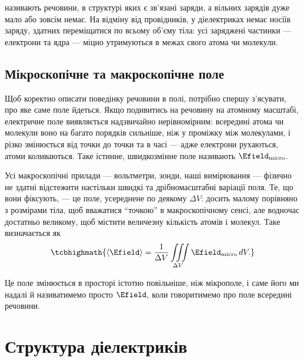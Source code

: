 \begin{Attention}
	 називають речовини, в структурі яких є зв'язані заряди, а вільних зарядів дуже мало або зовсім немає. На відміну від
	провідників, у діелектриках немає носіїв заряду, здатних переміщатися по всьому об'єму тіла: усі заряджені частинки --- електрони та ядра ---
	міцно утримуються в межах свого атома чи молекули.
\end{Attention}

\subsection*{Мікроскопічне та макроскопічне поле}

Щоб коректно описати поведінку речовини в полі, потрібно спершу з'ясувати, про яке саме поле йдеться. Якщо подивитись на речовину на атомному
масштабі, електричне поле виявляється надзвичайно нерівномірним: всередині атома чи молекули воно на багато порядків сильніше, ніж у проміжку між
молекулами, і різко змінюється від точки до точки та в часі --- адже електрони рухаються, атоми коливаються. Таке істинне, швидкозмінне поле
називають  $\Efield_\text{micro}$.

Усі макроскопічні прилади --- вольтметри, зонди, наші вимірювання --- фізично не здатні відстежити настільки швидкі та дрібномасштабні варіації поля.
Те, що вони фіксують, --- це поле, усереднене по деякому  $\Delta V$: досить малому порівняно з розмірами
тіла, щоб вважатися \enquote{точкою} в макроскопічному сенсі, але водночас достатньо великому, щоб містити величезну кількість атомів і молекул. Таке
 визначається як
\begin{equation}\label{eq:AvgField}
	\tcbhighmath{
		\left\langle \Efield\right\rangle = \frac1{\Delta V} \iiint\limits_{\Delta V} \Efield_\text{micro}\, dV.
	}
\end{equation}

Це поле змінюється в просторі істотно повільніше, ніж мікрополе, і саме його ми надалі й називатимемо просто $\Efield$, коли говоритимемо про поле
всередині речовини.

\section{Структура діелектриків}

